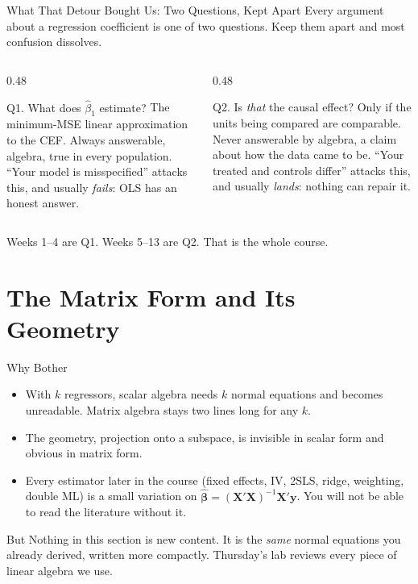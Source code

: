 \documentclass[aspectratio=169,11pt,xcolor=dvipsnames]{beamer}
\newcommand{\X}{\bm{X}}
\newcommand{\Y}{\bm{y}}
\newcommand{\bhat}{\hat{\bm{\beta}}}
\begin{document}
\begin{frame}{What That Detour Bought Us: Two Questions, Kept Apart}
Every argument about a regression coefficient is one of two questions. Keep them
apart and most confusion dissolves.
\vskip2pt
\begin{columns}[T]
\begin{column}{0.48\textwidth}
\begin{block}{Q1. What does $\hat\beta_1$ estimate?}
{\footnotesize
The minimum-MSE linear approximation to the CEF.
\vskip3pt
\alert{Always answerable}, algebra, true in every population.
\vskip3pt
``Your model is misspecified'' attacks this, and usually \emph{fails}: OLS has an
honest answer.}
\end{block}
\end{column}
\begin{column}{0.48\textwidth}
\begin{block}{Q2. Is \emph{that} the causal effect?}
{\footnotesize
Only if the units being compared are comparable.
\vskip3pt
\alert{Never answerable by algebra}, a claim about how the data came to be.
\vskip3pt
``Your treated and controls differ'' attacks this, and usually \emph{lands}:
nothing can repair it.}
\end{block}
\end{column}
\end{columns}
\vskip6pt
\pause
\alert{Weeks 1--4 are Q1. Weeks 5--13 are Q2.} That is the whole course.
\end{frame}

\section[Matrix Form]{The Matrix Form and Its Geometry}
\begin{frame}\sectionpage\end{frame}

\begin{frame}{Why Bother}
\begin{itemize}\itemsep5pt
  \item With $k$ regressors, scalar algebra needs $k$ normal equations and becomes
        unreadable. Matrix algebra stays two lines long for any $k$.
  \item The \alert{geometry}, projection onto a subspace, is invisible in
        scalar form and obvious in matrix form.
  \item Every estimator later in the course (fixed effects, IV, 2SLS, ridge,
        weighting, double ML) is a small variation on
        $\bhat = (\X'\X)^{-1}\X'\Y$. You will not be able to read the literature
        without it.
\end{itemize}
\vskip6pt
\begin{alertblock}{But}
Nothing in this section is new content. It is the \emph{same} normal equations
you already derived, written more compactly. Thursday's lab reviews every piece
of linear algebra we use.
\end{alertblock}
\end{frame}
\end{document}
